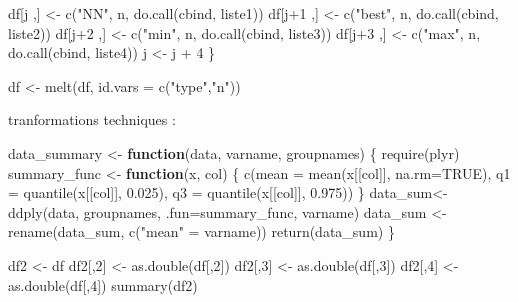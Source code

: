 \documentclass[
]{article}
\newenvironment{Shaded}{\begin{snugshade}}{\end{snugshade}}
\newcommand{\AttributeTok}[1]{\textcolor[rgb]{0.77,0.63,0.00}{#1}}
\newcommand{\ConstantTok}[1]{\textcolor[rgb]{0.00,0.00,0.00}{#1}}
\newcommand{\ControlFlowTok}[1]{\textcolor[rgb]{0.13,0.29,0.53}{\textbf{#1}}}
\newcommand{\DecValTok}[1]{\textcolor[rgb]{0.00,0.00,0.81}{#1}}
\newcommand{\FloatTok}[1]{\textcolor[rgb]{0.00,0.00,0.81}{#1}}
\newcommand{\FunctionTok}[1]{\textcolor[rgb]{0.00,0.00,0.00}{#1}}
\newcommand{\NormalTok}[1]{#1}
\newcommand{\OtherTok}[1]{\textcolor[rgb]{0.56,0.35,0.01}{#1}}
\newcommand{\SpecialCharTok}[1]{\textcolor[rgb]{0.00,0.00,0.00}{#1}}
\newcommand{\StringTok}[1]{\textcolor[rgb]{0.31,0.60,0.02}{#1}}
\begin{document}
\begin{Shaded}
\begin{Highlighting}[]
\NormalTok{  df[j ,] }\OtherTok{\textless{}{-}} \FunctionTok{c}\NormalTok{(}\StringTok{"NN"}\NormalTok{, n, }\FunctionTok{do.call}\NormalTok{(cbind, liste1))}
\NormalTok{  df[j}\SpecialCharTok{+}\DecValTok{1}\NormalTok{ ,] }\OtherTok{\textless{}{-}} \FunctionTok{c}\NormalTok{(}\StringTok{"best"}\NormalTok{, n, }\FunctionTok{do.call}\NormalTok{(cbind, liste2))}
\NormalTok{  df[j}\SpecialCharTok{+}\DecValTok{2}\NormalTok{ ,] }\OtherTok{\textless{}{-}} \FunctionTok{c}\NormalTok{(}\StringTok{"min"}\NormalTok{, n, }\FunctionTok{do.call}\NormalTok{(cbind, liste3))}
\NormalTok{  df[j}\SpecialCharTok{+}\DecValTok{3}\NormalTok{ ,] }\OtherTok{\textless{}{-}} \FunctionTok{c}\NormalTok{(}\StringTok{"max"}\NormalTok{, n, }\FunctionTok{do.call}\NormalTok{(cbind, liste4))}
\NormalTok{  j }\OtherTok{\textless{}{-}}\NormalTok{ j }\SpecialCharTok{+} \DecValTok{4}
\NormalTok{\}}

\NormalTok{df }\OtherTok{\textless{}{-}} \FunctionTok{melt}\NormalTok{(df, }\AttributeTok{id.vars =} \FunctionTok{c}\NormalTok{(}\StringTok{"type"}\NormalTok{,}\StringTok{"n"}\NormalTok{))}
\end{Highlighting}
\end{Shaded}

tranformations techniques :

\begin{Shaded}
\begin{Highlighting}[]
\NormalTok{data\_summary }\OtherTok{\textless{}{-}} \ControlFlowTok{function}\NormalTok{(data, varname, groupnames)}
\NormalTok{\{}
  \FunctionTok{require}\NormalTok{(plyr)}
\NormalTok{  summary\_func }\OtherTok{\textless{}{-}} \ControlFlowTok{function}\NormalTok{(x, col)}
\NormalTok{  \{}
    \FunctionTok{c}\NormalTok{(}\AttributeTok{mean =} \FunctionTok{mean}\NormalTok{(x[[col]], }\AttributeTok{na.rm=}\ConstantTok{TRUE}\NormalTok{),}
      \AttributeTok{q1 =} \FunctionTok{quantile}\NormalTok{(x[[col]], }\FloatTok{0.025}\NormalTok{), }\AttributeTok{q3 =} \FunctionTok{quantile}\NormalTok{(x[[col]], }\FloatTok{0.975}\NormalTok{))}
\NormalTok{  \}}
\NormalTok{  data\_sum}\OtherTok{\textless{}{-}}\FunctionTok{ddply}\NormalTok{(data, groupnames, }\AttributeTok{.fun=}\NormalTok{summary\_func,}
\NormalTok{                  varname)}
\NormalTok{  data\_sum }\OtherTok{\textless{}{-}} \FunctionTok{rename}\NormalTok{(data\_sum, }\FunctionTok{c}\NormalTok{(}\StringTok{"mean"} \OtherTok{=}\NormalTok{ varname))}
  \FunctionTok{return}\NormalTok{(data\_sum)}
\NormalTok{\}}

\NormalTok{df2 }\OtherTok{\textless{}{-}}\NormalTok{ df}
\NormalTok{df2[,}\DecValTok{2}\NormalTok{] }\OtherTok{\textless{}{-}} \FunctionTok{as.double}\NormalTok{(df[,}\DecValTok{2}\NormalTok{])}
\NormalTok{df2[,}\DecValTok{3}\NormalTok{] }\OtherTok{\textless{}{-}} \FunctionTok{as.double}\NormalTok{(df[,}\DecValTok{3}\NormalTok{])}
\NormalTok{df2[,}\DecValTok{4}\NormalTok{] }\OtherTok{\textless{}{-}} \FunctionTok{as.double}\NormalTok{(df[,}\DecValTok{4}\NormalTok{])}
\FunctionTok{summary}\NormalTok{(df2)}
\end{Highlighting}
\end{Shaded}
\end{document}
